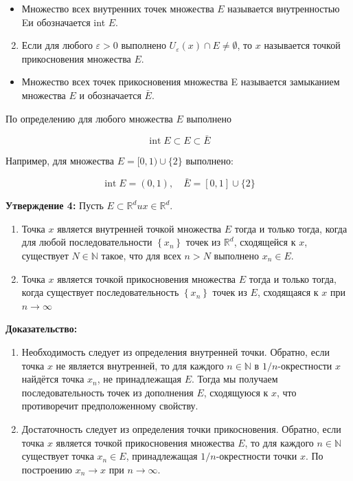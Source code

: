 \documentclass[a4paper,12pt]{article} %
\begin{document}
\begin{itemize}
  \item Множество всех внутренних точек множества $E$ называется внутренностью Eи обозначается int $E$.
\end{itemize}

\begin{enumerate}
  \setcounter{enumi}{1}
  \item Если для любого $\varepsilon>0$ выполнено $U_{\varepsilon}(x) \cap E \neq \emptyset$, то $x$ называется точкой прикосновения множества $E$.
\end{enumerate}

\begin{itemize}
  \item Множество всех точек прикосновения множества E называется замыканием множества $E$ и обозначается $\bar{E}$.
\end{itemize}

По определению для любого множества $E$ выполнено

$$
\operatorname{int} E \subset E \subset \bar{E}
$$

Например, для множества $E=[0,1) \cup\{2\}$ выполнено:

$$
\operatorname{int} E=(0,1), \quad \bar{E}=[0,1] \cup\{2\}
$$

\textbf{Утверждение 4:} Пусть $E \subset \mathbb{R}^{d} u x \in \mathbb{R}^{d}$.

\begin{enumerate}
  \item Точка $x$ является внутренней точкой множества $E$ тогда и только тогда, когда для любой последовательности $\left\{x_{n}\right\}$ точек из $\mathbb{R}^{d}$, сходящейся к $x$, существует $N \in \mathbb{N}$ такое, что для всех $n>N$ выполнено $x_{n} \in E$.

  \item Точка $x$ является точкой прикосновения множества $E$ тогда и только тогда, когда существует последовательность $\left\{x_{n}\right\}$ точек из $E$, сходящаяся к $x$ при $n \rightarrow \infty$

\end{enumerate}

\textbf{Доказательство:}\\
\begin{enumerate}
  \item Необходимость следует из определения внутренней точки. Обратно, если точка $x$ не является внутренней, то для каждого $n \in \mathbb{N}$ в $1 / n$-окрестности $x$ найдётся точка $x_{n}$, не принадлежащая $E$. Тогда мы получаем последовательность точек из дополнения $E$, сходящуюся к $x$, что противоречит предположенному свойству.

  \item Достаточность следует из определения точки прикосновения. Обратно, если точка $x$ является точкой прикосновения множества $E$, то для каждого $n \in \mathbb{N}$ существует точка $x_{n} \in E$, принадлежащая $1 / n$-окрестности точки $x$. По построению $x_{n} \rightarrow x$ при $n \rightarrow \infty$.

\end{enumerate}
\end{document}
